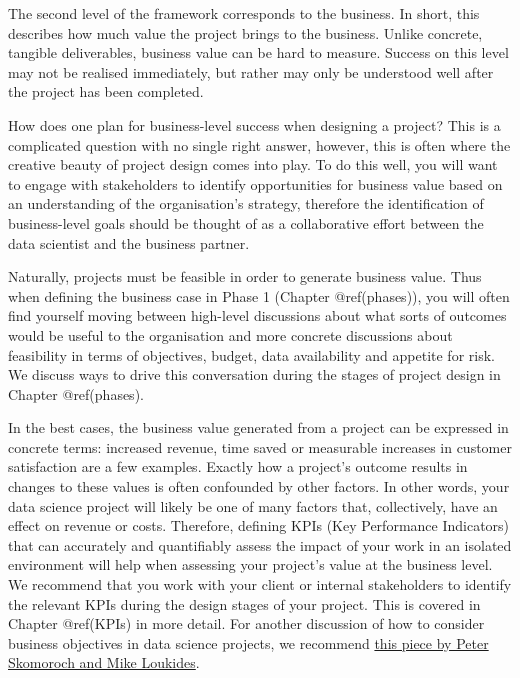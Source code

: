 \documentclass[]{book}
\begin{document}
The second level of the framework corresponds to the business. In short,
this describes how much value the project brings to the business. Unlike
concrete, tangible deliverables, business value can be hard to measure.
Success on this level may not be realised immediately, but rather may
only be understood well after the project has been completed.

How does one plan for business-level success when designing a project?
This is a complicated question with no single right answer, however,
this is often where the creative beauty of project design comes into
play. To do this well, you will want to engage with stakeholders to
identify opportunities for business value based on an understanding of
the organisation's strategy, therefore the identification of
business-level goals should be thought of as a collaborative effort
between the data scientist and the business partner.

Naturally, projects must be feasible in order to generate business
value. Thus when defining the business case in Phase 1 (Chapter
@ref(phases)), you will often find yourself moving between high-level
discussions about what sorts of outcomes would be useful to the
organisation and more concrete discussions about feasibility in terms of
objectives, budget, data availability and appetite for risk. We discuss
ways to drive this conversation during the stages of project design in
Chapter @ref(phases).

In the best cases, the business value generated from a project can be
expressed in concrete terms: increased revenue, time saved or measurable
increases in customer satisfaction are a few examples. Exactly how a
project's outcome results in changes to these values is often confounded
by other factors. In other words, your data science project will likely
be one of many factors that, collectively, have an effect on revenue or
costs. Therefore, defining KPIs (Key Performance Indicators) that can
accurately and quantifiably assess the impact of your work in an
isolated environment will help when assessing your project's value at
the business level. We recommend that you work with your client or
internal stakeholders to identify the relevant KPIs during the design
stages of your project. This is covered in Chapter @ref(KPIs) in more
detail. For another discussion of how to consider business objectives in
data science projects, we recommend
\href{https://www.oreilly.com/radar/what-you-need-to-know-about-product-management-for-ai/}{this
piece by Peter Skomoroch and Mike Loukides}.
\end{document}
